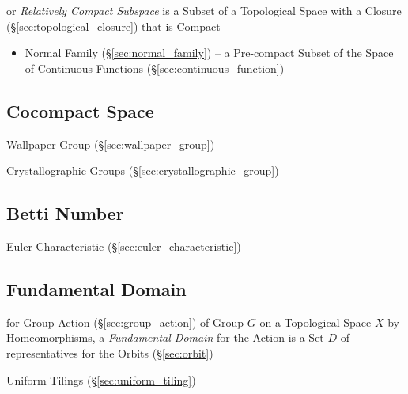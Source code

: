 or \emph{Relatively Compact Subspace} is a Subset of a Topological Space with a
Closure (\S\ref{sec:topological_closure}) that is Compact

\begin{itemize}
  \item Normal Family (\S\ref{sec:normal_family}) -- a Pre-compact Subset of the
    Space of Continuous Functions (\S\ref{sec:continuous_function})
\end{itemize}



\subsection{Cocompact Space}\label{sec:cocompact_space}

Wallpaper Group (\S\ref{sec:wallpaper_group})

Crystallographic Groups (\S\ref{sec:crystallographic_group})



\subsection{Betti Number}\label{sec:betti_number}

Euler Characteristic (\S\ref{sec:euler_characteristic})



\subsection{Fundamental Domain}\label{sec:fundamental_domain}

for Group Action (\S\ref{sec:group_action}) of Group $G$ on a Topological Space
$X$ by Homeomorphisms, a \emph{Fundamental Domain} for the Action is a Set $D$
of representatives for the Orbits (\S\ref{sec:orbit})

Uniform Tilings (\S\ref{sec:uniform_tiling})



